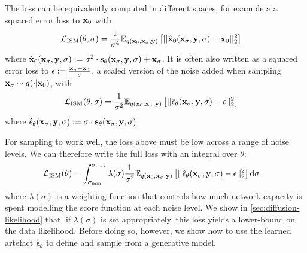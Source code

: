 The loss can be equivalently computed in different spaces, for example a a squared error loss to ${\mathbf{x}}_0$ with
\begin{align}
    \mathcal{L}_\text{ISM}(\theta, \sigma) &= \frac{1}{\sigma^4} \mathbb{E}_{q({\mathbf{x}}_0, {\mathbf{x}}_\sigma, {\mathbf{y}})} \left[ 
    || \hat{{\mathbf{x}}}_0({\mathbf{x}}_\sigma, {\mathbf{y}}, \sigma) - {\mathbf{x}}_0 ||_2^2 \right]
\end{align}
where $\hat{{\mathbf{x}}}_0({\mathbf{x}}_\sigma, {\mathbf{y}}, \sigma) := \sigma^2 \cdot {\mathbf{s}}_\theta({\mathbf{x}}_\sigma, {\mathbf{y}}, \sigma) + {\mathbf{x}}_\sigma$. 
It is often also written as a squared error loss to $\epsilon := \frac{{\mathbf{x}}_\sigma - {\mathbf{x}}_0}{\sigma}$, a scaled version of the noise added when sampling ${\mathbf{x}}_\sigma \sim q(\cdot|{\mathbf{x}}_0)$, with
\begin{align}
    \mathcal{L}_\text{ISM}(\theta, \sigma) &= \frac{1}{\sigma^2} \mathbb{E}_{q({\mathbf{x}}_0, {\mathbf{x}}_\sigma, {\mathbf{y}})} \left[ 
    || \hat{\mathbf{\epsilon}}_\theta({\mathbf{x}}_\sigma, {\mathbf{y}}, \sigma) - \epsilon ||_2^2 \right]
\end{align}
where $\hat{\mathbf{\epsilon}}_\theta({\mathbf{x}}_\sigma, {\mathbf{y}}, \sigma) := \sigma \cdot {\mathbf{s}}_\theta({\mathbf{x}}_\sigma, {\mathbf{y}}, \sigma)$.

For sampling to work well, the loss above must be low across a range of noise levels. We can therefore write the full loss with an integral over $\theta$:
\begin{align} \label{eq:diffusion-loss-all-sigma}
    \mathcal{L}_\text{ISM}(\theta) &= \int_{\sigma_\text{min}}^{\sigma_\text{max}} \lambda(\sigma) \frac{1}{\sigma^2} \mathbb{E}_{q({\mathbf{x}}_0, {\mathbf{x}}_\sigma, {\mathbf{y}})} \left[ 
    || \hat{\mathbf{\epsilon}}_\theta({\mathbf{x}}_\sigma, {\mathbf{y}}, \sigma) - \epsilon ||_2^2 \right] \mathrm{d}\sigma
\end{align}
where $\lambda(\sigma)$ is a weighting function that controls how much network capacity is spent modelling the score function at each noise level. We show in \cref{sec:diffusion-likelihood} that, if $\lambda(\sigma)$ is set appropriately, this loss yields a lower-bound on the data likelihood. Before doing so, however, we show how to use the learned artefact $\hat{\mathbf{\epsilon}}_\theta$ to define and sample from a generative model.



